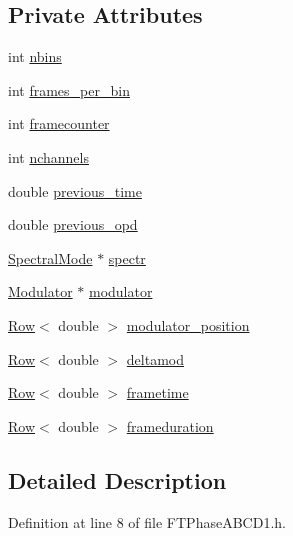 \subsection*{Private Attributes}
\begin{DoxyCompactItemize}
\item 
int \hyperlink{classFTPhaseABCD1_a6346350122f18739641a583fa6bb6480}{nbins}
\item 
int \hyperlink{classFTPhaseABCD1_a5f8098aa51b878962500a3bae1eac959}{frames\_\-per\_\-bin}
\item 
int \hyperlink{classFTPhaseABCD1_a2db315608806d1b281341482fd8123e7}{framecounter}
\item 
int \hyperlink{classFTPhaseABCD1_adc6d698b02a5ac590368df1c94ef1f9c}{nchannels}
\item 
double \hyperlink{classFTPhaseABCD1_a42f5c115652dfc81584d2784f129f714}{previous\_\-time}
\item 
double \hyperlink{classFTPhaseABCD1_a4775273ef7115bdb72e25501d0c948f3}{previous\_\-opd}
\item 
\hyperlink{classSpectralMode}{SpectralMode} $\ast$ \hyperlink{classFTPhaseABCD1_ab56ac2436c8084fb4601d64686338519}{spectr}
\item 
\hyperlink{classModulator}{Modulator} $\ast$ \hyperlink{classFTPhaseABCD1_adc5fbcfc33764d9ccf0ab886e2d1899c}{modulator}
\item 
\hyperlink{classRow}{Row}$<$ double $>$ \hyperlink{classFTPhaseABCD1_ab5f6042aa8eee4a574fbfd72279f81ca}{modulator\_\-position}
\item 
\hyperlink{classRow}{Row}$<$ double $>$ \hyperlink{classFTPhaseABCD1_aeb7776acda071f75923ff5ffe51b8d1e}{deltamod}
\item 
\hyperlink{classRow}{Row}$<$ double $>$ \hyperlink{classFTPhaseABCD1_a7dacaa305568f8fc4d0a59f4df383142}{frametime}
\item 
\hyperlink{classRow}{Row}$<$ double $>$ \hyperlink{classFTPhaseABCD1_a21916a5951e6c54a7aa568642769b614}{frameduration}
\end{DoxyCompactItemize}


\subsection{Detailed Description}


Definition at line 8 of file FTPhaseABCD1.h.



